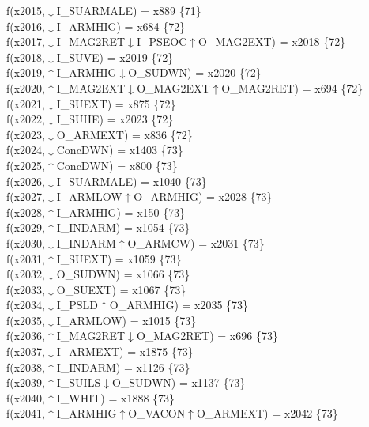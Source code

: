 f(x2015,$\downarrow$I\_SUARMALE) = x889 \{71\} \\  
f(x2016,$\downarrow$I\_ARMHIG) = x684 \{72\} \\  
f(x2017,$\downarrow$I\_MAG2RET$\downarrow$I\_PSEOC$\uparrow$O\_MAG2EXT) = x2018 \{72\} \\  
f(x2018,$\downarrow$I\_SUVE) = x2019 \{72\} \\  
f(x2019,$\uparrow$I\_ARMHIG$\downarrow$O\_SUDWN) = x2020 \{72\} \\  
f(x2020,$\uparrow$I\_MAG2EXT$\downarrow$O\_MAG2EXT$\uparrow$O\_MAG2RET) = x694 \{72\} \\  
f(x2021,$\downarrow$I\_SUEXT) = x875 \{72\} \\  
f(x2022,$\downarrow$I\_SUHE) = x2023 \{72\} \\  
f(x2023,$\downarrow$O\_ARMEXT) = x836 \{72\} \\  
f(x2024,$\downarrow$ConcDWN) = x1403 \{73\} \\  
f(x2025,$\uparrow$ConcDWN) = x800 \{73\} \\  
f(x2026,$\downarrow$I\_SUARMALE) = x1040 \{73\} \\  
f(x2027,$\downarrow$I\_ARMLOW$\uparrow$O\_ARMHIG) = x2028 \{73\} \\  
f(x2028,$\uparrow$I\_ARMHIG) = x150 \{73\} \\  
f(x2029,$\uparrow$I\_INDARM) = x1054 \{73\} \\  
f(x2030,$\downarrow$I\_INDARM$\uparrow$O\_ARMCW) = x2031 \{73\} \\  
f(x2031,$\uparrow$I\_SUEXT) = x1059 \{73\} \\  
f(x2032,$\downarrow$O\_SUDWN) = x1066 \{73\} \\  
f(x2033,$\downarrow$O\_SUEXT) = x1067 \{73\} \\  
f(x2034,$\downarrow$I\_PSLD$\uparrow$O\_ARMHIG) = x2035 \{73\} \\  
f(x2035,$\downarrow$I\_ARMLOW) = x1015 \{73\} \\  
f(x2036,$\uparrow$I\_MAG2RET$\downarrow$O\_MAG2RET) = x696 \{73\} \\  
f(x2037,$\downarrow$I\_ARMEXT) = x1875 \{73\} \\  
f(x2038,$\uparrow$I\_INDARM) = x1126 \{73\} \\  
f(x2039,$\uparrow$I\_SUILS$\downarrow$O\_SUDWN) = x1137 \{73\} \\  
f(x2040,$\uparrow$I\_WHIT) = x1888 \{73\} \\  
f(x2041,$\uparrow$I\_ARMHIG$\uparrow$O\_VACON$\uparrow$O\_ARMEXT) = x2042 \{73\} \\  
